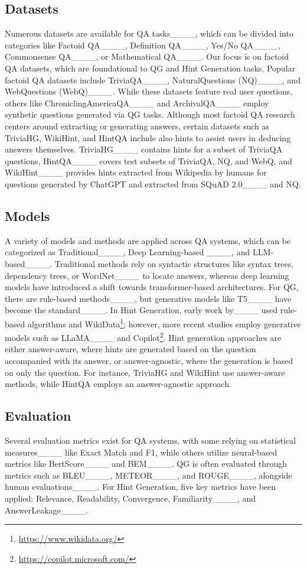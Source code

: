\subsection{Datasets} \label{ss:related_work_dataset}
Numerous datasets are available for QA tasks____, which can be divided into categories like Factoid QA____, Definition QA____, Yes/No QA____, Commonsense QA____, or Mathematical QA____. Our focus is on factoid QA datasets, which are foundational to QG and Hint Generation tasks. Popular factoid QA datasets include TriviaQA____, NaturalQuestions (NQ)____, and WebQuestions (WebQ)____. While these datasets feature real user questions, others like ChroniclingAmericaQA____ and ArchivalQA____ employ synthetic questions generated via QG tasks. Although most factoid QA research centers around extracting or generating answers, certain datasets such as TriviaHG, WikiHint, and HintQA include also hints to assist users in deducing answers themselves. TriviaHG____ contains hints for a subset of TriviaQA questions, HintQA____ covers test subsets of TriviaQA, NQ, and WebQ, and WikiHint____ provides hints extracted from Wikipedia by humans for questions generated by ChatGPT and extracted from SQuAD 2.0____ and NQ.

\subsection{Models} \label{ss:related_work_model}
A variety of models and methods are applied across QA systems, which can be categorized as Traditional____, Deep Learning-based ____, and LLM-based____. Traditional methods rely on syntactic structures like syntax trees, dependency trees, or WordNet____ to locate answers, whereas deep learning models have introduced a shift towards transformer-based architectures. For QG, there are rule-based methods____, but generative models like T5____ have become the standard____. In Hint Generation, early work by____ used rule-based algorithms and WikiData\footnote{\url{https://www.wikidata.org/}}; however, more recent studies employ generative models such as LLaMA____ and Copilot\footnote{\url{https://copilot.microsoft.com/}}. Hint generation approaches are either answer-aware, where hints are generated based on the question accompanied with its answer, or answer-agnostic, where the generation is based on only the question. For instance, TriviaHG and WikiHint use answer-aware methods, while HintQA employs an answer-agnostic approach.

\subsection{Evaluation} \label{ss:related_work_evaluation}
Several evaluation metrics exist for QA systems, with some relying on statistical measures____ like Exact Match and F1, while others utilize neural-based metrics like BertScore____ and BEM____. QG is often evaluated through metrics such as BLEU____, METEOR____, and ROUGE____, alongside human evaluations____. For Hint Generation, five key metrics have been applied: Relevance, Readability, Convergence, Familiarity____, and AnswerLeakage____.

